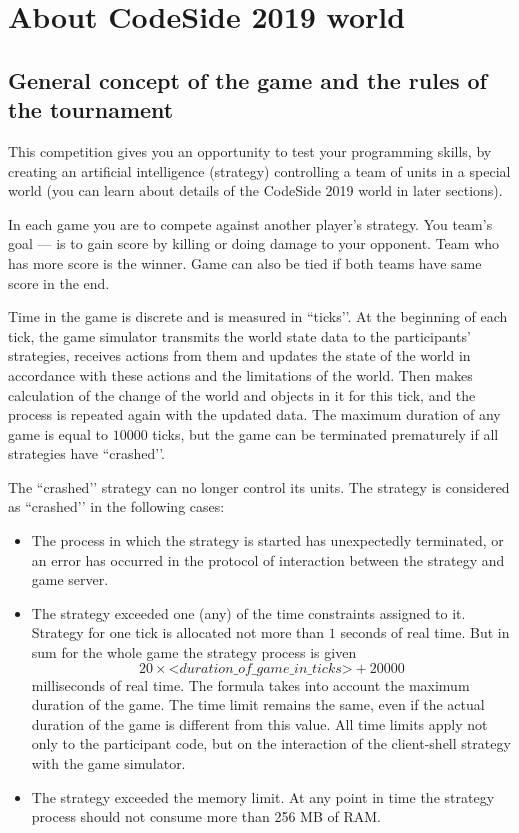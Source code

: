 \chapter{About CodeSide 2019 world}

\section{General concept of the game and the rules of the tournament}

This competition gives you an opportunity to test your programming skills,
by creating an artificial intelligence (strategy)
controlling a team of units in a special world
(you can learn about details of the CodeSide 2019 world in later sections).

In each game you are to compete against another player's strategy.
You team's goal --- is to gain score by killing or doing damage to your opponent.
Team who has more score is the winner.
Game can also be tied if both teams have same score in the end.

Time in the game is discrete and is measured in ``ticks’’.
At the beginning of each tick, the game simulator transmits the world state data to the participants' strategies,
receives actions from them and updates the state of the world in accordance with these actions and the limitations of the world.
Then makes calculation of the change of the world and objects in it for this tick, and the process is repeated again with the updated data.
The maximum duration of any game is equal to $10000$ ticks, but the game can be terminated prematurely if all strategies have ``crashed’’.

The ``crashed’’ strategy can no longer control its units. The strategy is considered as ``crashed’’ in the following cases:
\begin{itemize}
\item The process in which the strategy is started has unexpectedly terminated,
      or an error has occurred in the protocol of interaction between the strategy and game server.
\item The strategy exceeded one (any) of the time constraints assigned to it.
      Strategy for one tick is allocated not more than $1$ seconds of real time.
      But in sum for the whole game the strategy process is given
      \begin{equation}
      20\times\textit{<duration\_of\_game\_in\_ticks>}+20000
      \end{equation}
      milliseconds of real time.
      The formula takes into account the maximum duration of the game. The time limit remains the same, even if
      the actual duration of the game is different from this value. All time limits apply not only to the participant code, but
      on the interaction of the client-shell strategy with the game simulator.
\item The strategy exceeded the memory limit. At any point in time the strategy process should not consume more than 256 MB of RAM.
\end{itemize}

